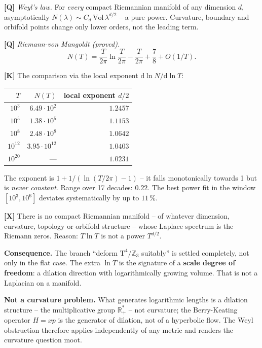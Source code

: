 \textbf{[Q]} \emph{Weyl's law.} For \emph{every} compact Riemannian
manifold of any dimension $d$, asymptotically
$N(\lambda) \sim C_d\,\text{Vol}\,\lambda^{d/2}$ -- a pure power.
Curvature, boundary and orbifold points change only lower orders, not
the leading term.

\textbf{[Q]} \emph{Riemann-von Mangoldt (proved).}
\[
  N(T) = \frac{T}{2\pi}\ln\frac{T}{2\pi} - \frac{T}{2\pi}
  + \frac78 + O(1/T).
\]

\textbf{[K]} The comparison via the local exponent
$\mathrm d\ln N/\mathrm d\ln T$:

\begin{center}
\begin{tabular}{rrr}
\toprule
$T$ & $N(T)$ & local exponent $d/2$ \\
\midrule
$10^{3}$ & $6.49\cdot10^{2}$ & $1.2457$ \\
$10^{5}$ & $1.38\cdot10^{5}$ & $1.1153$ \\
$10^{8}$ & $2.48\cdot10^{8}$ & $1.0642$ \\
$10^{12}$ & $3.95\cdot10^{12}$ & $1.0403$ \\
$10^{20}$ & --- & $1.0231$ \\
\bottomrule
\end{tabular}
\end{center}

The exponent is $1 + 1/(\ln(T/2\pi) - 1)$ -- it falls monotonically towards 1
but is \emph{never constant}. Range over 17 decades: $0.22$. The best
power fit in the window $[10^3, 10^6]$ deviates systematically by up to
$11\,\%$.

\begin{keyresult}
\textbf{[X]} There is no compact Riemannian manifold -- of whatever
dimension, curvature, topology or orbifold structure -- whose Laplace
spectrum is the Riemann zeros. Reason: $T\ln T$ is not a power
$T^{d/2}$.
\end{keyresult}

\textbf{Consequence.} The branch \enquote{deform
$\text{T}^4/\mathbb{Z}_3$ suitably} is settled completely, not only in
the flat case. The extra $\ln T$ is the signature of a \textbf{scale
degree of freedom}: a dilation direction with logarithmically growing
volume. That is not a Laplacian on a manifold.

\textbf{Not a curvature problem.} What generates logarithmic lengths
is a dilation structure -- the multiplicative group $\mathbb{R}_+^*$ --
not curvature; the Berry-Keating operator $H = xp$ is the generator of
dilation, not of a hyperbolic flow. The Weyl obstruction therefore
applies independently of any metric and renders the curvature question
moot.

